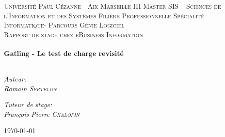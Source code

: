 \begin{titlepage}

\begin{center}



\textsc{\LARGE Université Paul Cézanne - Aix-Marseille III 
Master SIS – Sciences de l’Information et des Systèmes
Filière Professionnelle 
Spécialité Informatique- Parcours Génie Logiciel}\\[1.5cm]

\textsc{\Large Rapport de stage chez eBusiness Information}\\[0.5cm]


\HRule \\[0.4cm]
{ \huge \bfseries Gatling - Le test de charge revisité}\\[0.4cm]

\HRule \\[1.5cm]

\begin{minipage}{0.4\textwidth}
\begin{flushleft} \large
\em{Auteur:}\\
Romain \textsc{Sertelon}
\end{flushleft}
\end{minipage}

\begin{minipage}{0.4\textwidth}
\begin{flushright} \large
\em{Tuteur de stage:}\\
François-Pierre \textsc{Chalopin}
\end{flushright}
\end{minipage}

\vfill

{\large \today}

\end{center}

\end{titlepage}